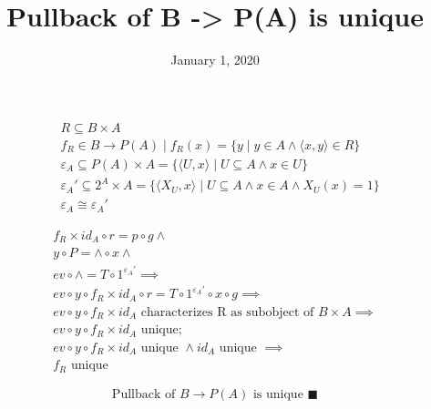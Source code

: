 \documentclass[11pt]{article}
\date{January 1, 2020}
\title{Pullback of B -> P(A) is unique}
\begin{document}
\begin{multicols}{2}

\columnbreak

\begin{equation*}
\begin{aligned}
& R \subseteq B \times A \\
& f_{R} \in B \rightarrow P(A) \mid f_{R}(x) = 
  \{y \mid y \in A \land \langle x, y \rangle \in R\} \\
& \varepsilon_{A} \subseteq P(A) \times A = 
  \{ \langle U, x \rangle \mid U \subseteq A \land x \in U \} \\
& \varepsilon_{A}' \subseteq 2^{A} \times A =
  \{ \langle X_{U}, x \rangle \mid 
      U \subseteq A \land x \in A \land X_{U}(x) = 1 \} \\
& \varepsilon_{A} \cong \varepsilon_{A}'
\end{aligned}
\end{equation*}

\end{multicols}

\begin{equation*}
\begin{aligned}
& f_{R} \times id_{A} \circ r = p \circ g \land \\
& y \circ P = \wedge \circ x \land \\
& ev \circ \wedge = T \circ 1^{\varepsilon_{A}'} \implies \\
& ev \circ y \circ f_{R} \times id_{A} \circ r =
  T \circ 1^{\varepsilon_{A}'} \circ x \circ g \implies \\
& ev \circ y \circ f_{R} \times id_{A} 
  \text{ characterizes R as subobject of } B \times A \implies \\
& ev \circ y \circ f_{R} \times id_{A} \text{ unique};
& \\
& ev \circ y \circ f_{R} \times id_{A} \text{ unique } \land
  id_{A} \text{ unique } \implies \\
& f_{R} \text{ unique}
\end{aligned}
\end{equation*}

\hrulefill

$$ \text{Pullback of } B \rightarrow P(A) \text{ is unique }\blacksquare $$
\end{document}
